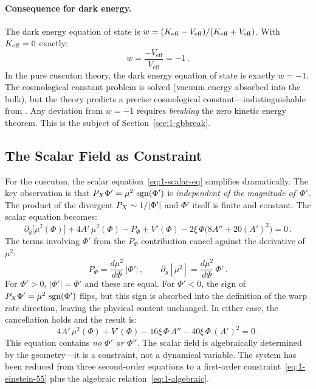 \paragraph{Consequence for dark energy.} The dark energy equation of state is $w = (K_{\mathrm{eff}} - V_{\mathrm{eff}})/(K_{\mathrm{eff}} + V_{\mathrm{eff}})$. With $K_{\mathrm{eff}} = 0$ exactly:
\begin{equation}
\label{eq:1-w-exact}
w = \frac{-V_{\mathrm{eff}}}{V_{\mathrm{eff}}} = -1\,.
\end{equation}
In the pure cuscuton theory, the dark energy equation of state is exactly $w = -1$. The cosmological constant problem is solved (vacuum energy absorbed into the bulk), but the theory predicts a precise cosmological constant---indistinguishable from \LCDM. Any deviation from $w = -1$ requires \emph{breaking} the zero kinetic energy theorem. This is the subject of Section~\ref{sec:1-gbbreak}.

\subsection{The Scalar Field as Constraint}
\label{sec:1-constraint}

For the cuscuton, the scalar equation~\eqref{eq:1-scalar-eq} simplifies dramatically. The key observation is that $P_X \Phi' = \mu^2\, \operatorname{sgn}(\Phi')$ is \emph{independent of the magnitude of~$\Phi'$}. The product of the divergent $P_X \sim 1/|\Phi'|$ and $\Phi'$ itself is finite and constant. The scalar equation becomes:
\begin{equation}
\label{eq:1-scalar-simplified}
\partial_y\bigl[\mu^2(\Phi)\bigr] + 4A'\, \mu^2(\Phi) - P_\Phi + V'(\Phi) - 2\xi\,\Phi\bigl(8A'' + 20(A')^2\bigr) = 0\,.
\end{equation}
The terms involving $\Phi'$ from the $P_\Phi$ contribution cancel against the derivative of $\mu^2$:
\begin{equation}
P_\Phi = \frac{d\mu^2}{d\Phi}\,|\Phi'|\,, \qquad \partial_y[\mu^2] = \frac{d\mu^2}{d\Phi}\,\Phi'\,.
\end{equation}
For $\Phi' > 0$, $|\Phi'| = \Phi'$ and these are equal. For $\Phi' < 0$, the sign of $P_X \Phi' = \mu^2\, \operatorname{sgn}(\Phi')$ flips, but this sign is absorbed into the definition of the warp rate direction, leaving the physical content unchanged. In either case, the cancellation holds and the result is:
\begin{equation}
\label{eq:1-algebraic}
4A'\, \mu^2(\Phi) + V'(\Phi) - 16\xi\,\Phi\, A'' - 40\xi\,\Phi\,(A')^2 = 0\,.
\end{equation}
This equation contains \emph{no $\Phi'$ or $\Phi''$}. The scalar field is algebraically determined by the geometry---it is a constraint, not a dynamical variable. The system has been reduced from three second-order equations to a first-order constraint~\eqref{eq:1-einstein-55} plus the algebraic relation~\eqref{eq:1-algebraic}.

